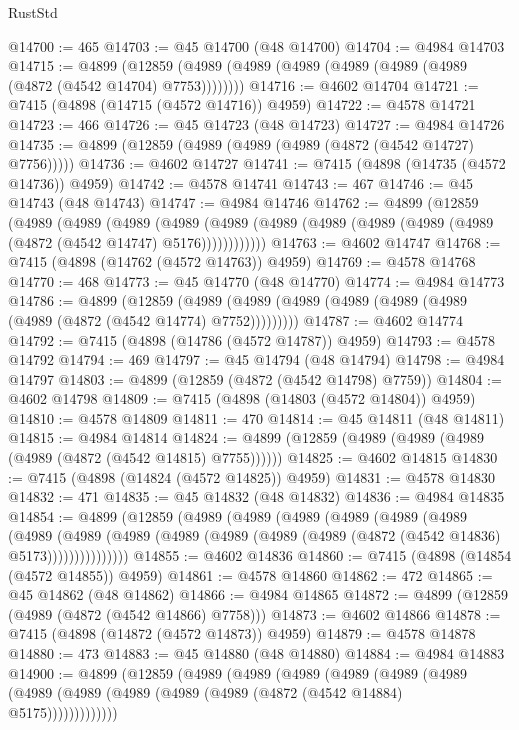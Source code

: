 \begin{lexlean}{RustStd}
\begin{coremodule}
@14700 := 465
@14703 := @45 @14700 (@48 @14700)
@14704 := @4984 @14703
@14715 := @4899
    (@12859 (@4989 (@4989 (@4989 (@4989 (@4989 (@4989 (@4872 (@4542 @14704) @7753))))))))
@14716 := @4602 @14704
@14721 := @7415 (@4898 (@14715 (@4572 @14716)) @4959)
@14722 := @4578 @14721
@14723 := 466
@14726 := @45 @14723 (@48 @14723)
@14727 := @4984 @14726
@14735 := @4899 (@12859 (@4989 (@4989 (@4989 (@4872 (@4542 @14727) @7756)))))
@14736 := @4602 @14727
@14741 := @7415 (@4898 (@14735 (@4572 @14736)) @4959)
@14742 := @4578 @14741
@14743 := 467
@14746 := @45 @14743 (@48 @14743)
@14747 := @4984 @14746
@14762 := @4899
    (@12859
      (@4989
        (@4989
          (@4989
            (@4989 (@4989 (@4989 (@4989 (@4989 (@4989 (@4989 (@4872 (@4542 @14747) @5176))))))))))))
@14763 := @4602 @14747
@14768 := @7415 (@4898 (@14762 (@4572 @14763)) @4959)
@14769 := @4578 @14768
@14770 := 468
@14773 := @45 @14770 (@48 @14770)
@14774 := @4984 @14773
@14786 := @4899
    (@12859 (@4989 (@4989 (@4989 (@4989 (@4989 (@4989 (@4989 (@4872 (@4542 @14774) @7752)))))))))
@14787 := @4602 @14774
@14792 := @7415 (@4898 (@14786 (@4572 @14787)) @4959)
@14793 := @4578 @14792
@14794 := 469
@14797 := @45 @14794 (@48 @14794)
@14798 := @4984 @14797
@14803 := @4899 (@12859 (@4872 (@4542 @14798) @7759))
@14804 := @4602 @14798
@14809 := @7415 (@4898 (@14803 (@4572 @14804)) @4959)
@14810 := @4578 @14809
@14811 := 470
@14814 := @45 @14811 (@48 @14811)
@14815 := @4984 @14814
@14824 := @4899 (@12859 (@4989 (@4989 (@4989 (@4989 (@4872 (@4542 @14815) @7755))))))
@14825 := @4602 @14815
@14830 := @7415 (@4898 (@14824 (@4572 @14825)) @4959)
@14831 := @4578 @14830
@14832 := 471
@14835 := @45 @14832 (@48 @14832)
@14836 := @4984 @14835
@14854 := @4899
    (@12859
      (@4989
        (@4989
          (@4989
            (@4989
              (@4989
                (@4989
                  (@4989
                    (@4989
                      (@4989 (@4989 (@4989 (@4989 (@4989 (@4872 (@4542 @14836) @5173)))))))))))))))
@14855 := @4602 @14836
@14860 := @7415 (@4898 (@14854 (@4572 @14855)) @4959)
@14861 := @4578 @14860
@14862 := 472
@14865 := @45 @14862 (@48 @14862)
@14866 := @4984 @14865
@14872 := @4899 (@12859 (@4989 (@4872 (@4542 @14866) @7758)))
@14873 := @4602 @14866
@14878 := @7415 (@4898 (@14872 (@4572 @14873)) @4959)
@14879 := @4578 @14878
@14880 := 473
@14883 := @45 @14880 (@48 @14880)
@14884 := @4984 @14883
@14900 := @4899
    (@12859
      (@4989
        (@4989
          (@4989
            (@4989
              (@4989
                (@4989 (@4989 (@4989 (@4989 (@4989 (@4989 (@4872 (@4542 @14884) @5175)))))))))))))

\end{coremodule}
\end{lexlean}
